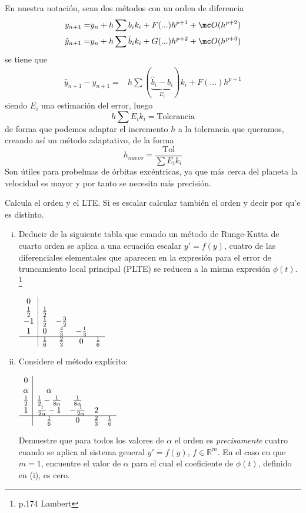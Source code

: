 En nuestra notación, sean dos m\'etodos con un orden de diferencia
\begin{align*}
    y_{n+1} = & y_n+ h \sum b_i k_i + F(...) h^{p+1} + \mc O(h^{p+2}) \\
    \hat y _{n+1} = & y_n+ h \sum \hat b _i k_i + G(...) h^{p+2} + \mc O(h^{p+3})  
 \end{align*}
 se tiene que 
 \begin{align*}
    \hat y _{n+1}  - y_{n+1} = & h \sum (\underbrace{\hat b_i-b_i}_{E_i}) k_i + F(...) h^{p+1} 
 \end{align*}
 siendo $E_i$ una estimaci\'on del error, luego
 $$h \sum E_i k_i = \text{Tolerancia}$$
 de forma que podemos adaptar el incremento $h$ a la tolerancia que queramos, creando as\'i un m\'etodo adaptativo, de la forma
 $$h_{nuevo} = \frac{\text{Tol}}{\sum E_i k_i}$$
Son \'utiles para probelmas de \'orbitas exc\'entricas, ya que m\'as cerca del planeta la velocidad es mayor y por tanto se necesita m\'as precisi\'on.
\begin{ejer}
    [5.8.3] Calcula el orden y el LTE. Si es escalar calcular tambi\'en el orden y decir por qu'e es distinto.  
    \begin{enumerate}[i)]
        \item Deducir de la siguiente tabla que cuando un método de Runge-Kutta de cuarto orden se aplica a una ecuación escalar $y' = f(y)$, cuatro de las diferenciales elementales que aparecen en la expresión para el error de truncamiento local principal (PLTE) se reducen a la misma expresión $\phi(t)$. \footnote{p.174 Lambert}
        \begin{center}
$\begin{array}{c|cccc}
0 & \\
\frac{1}{2} & \frac{1}{2} \\
-1 & \frac{1}{2} & -\frac{3}{2}   \\
1 & 0 & \frac{4}{3} & -\frac{1}{3} \\
\hline
& \frac{1}{6} & \frac{2}{3} & 0 & \frac{1}{6}
\end{array}$
\end{center}
        \item Considere el método explícito:
\begin{center}
$\begin{array}{c|cccc}
0 & \\
\alpha & \alpha & \\
\frac{1}{2} & \frac{1}{2} - \frac{1}{8\alpha} & \frac{1}{8\alpha} &  \\
1 & \frac{1}{2\alpha} - 1 & -\frac{1}{2\alpha} & 2 &  \\
\hline
& \frac{1}{6} & 0 & \frac{2}{3} & \frac{1}{6}
\end{array}$
\end{center}
Demuestre que para todos los valores de $\alpha$ el orden es \emph{precisamente} cuatro cuando se aplica al sistema general $y' = f(y)$, $f \in \mathbb{R}^m$. En el caso en que $m = 1$, encuentre el valor de $\alpha$ para el cual el coeficiente de $\phi(t)$, definido en (i), es cero.
    \end{enumerate}
\end{ejer}

